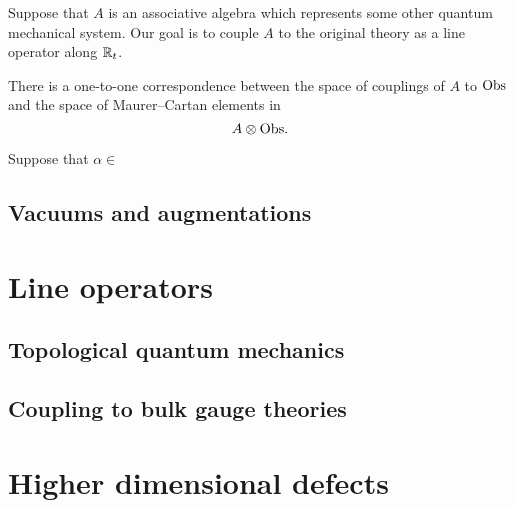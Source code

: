 \documentclass[11pt]{amsart}
\begin{document}
Suppose that $A$ is an associative algebra which represents some other quantum mechanical system. 
Our goal is to couple $A$ to the original theory as a line operator along $\mathbb R_t$. 

\begin{prop}
There is a one-to-one correspondence between the space of couplings of $A$ to ${\rm Obs}$ and the space of Maurer--Cartan elements in 
\[
A \otimes {\rm Obs} .
\]
\end{prop}

Suppose that $\alpha \in $

\subsection{Vacuums and augmentations}


\section{Line operators}


\subsection{Topological quantum mechanics}


\subsection{Coupling to bulk gauge theories}


\section{Higher dimensional defects} 

\end{document}
